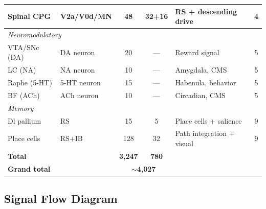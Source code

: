\documentclass[11pt,a4paper]{article}
\begin{document}
\begin{table}[H]
\begin{tabular}{llcclc}
Spinal CPG      & V2a/V0d/MN  &  48     & 32+16 & RS + descending drive      & 4 \\
\midrule
\multicolumn{6}{l}{\textit{Neuromodulatory}} \\
VTA/SNc (DA)    & DA neuron   &  20     & --- & Reward signal                & 5 \\
LC (NA)         & NA neuron   &  10     & --- & Amygdala, CMS                & 5 \\
Raphe (5-HT)    & 5-HT neuron &  15     & --- & Habenula, behavior           & 5 \\
BF (ACh)        & ACh neuron  &  10     & --- & Circadian, CMS               & 5 \\
\midrule
\multicolumn{6}{l}{\textit{Memory}} \\
Dl pallium      & RS          &  15     &  5  & Place cells + salience       & 9 \\
Place cells     & RS+IB       & 128     & 32  & Path integration + visual    & 9 \\
\midrule
\textbf{Total} & & \textbf{3,247} & \textbf{780} & & \\
\midrule
\textbf{Grand total} & & \multicolumn{2}{c}{\textbf{$\sim$4,027}} & & \\
\bottomrule
\end{tabular}
\end{table}

\subsection{Signal Flow Diagram}
\end{document}
